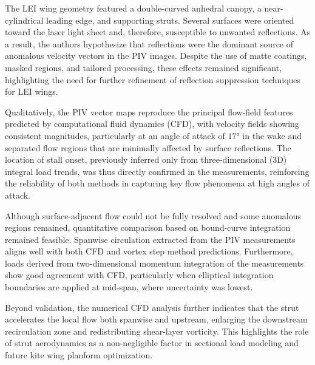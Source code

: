 \documentclass[wes, manuscript]{copernicus}
\begin{document}
The LEI wing geometry featured a double-curved anhedral canopy, a near-cylindrical leading edge, and supporting struts. Several surfaces were oriented toward the laser light sheet and, therefore, susceptible to unwanted reflections.
As a result, the authors hypothesize that reflections were the dominant source of anomalous velocity vectors in the PIV images. Despite the use of matte coatings, masked regions, and tailored processing, these effects remained significant, highlighting the need for further refinement of reflection suppression techniques for LEI wings.

Qualitatively, the PIV vector maps reproduce the principal flow-field features predicted by computational fluid dynamics (CFD), with velocity fields showing consistent magnitudes, particularly at an angle of attack of $17\unit{\degree}$ in the wake and separated flow regions that are minimally affected by surface reflections. The location of stall onset, previously inferred only from three-dimensional (3D) integral load trends, was thus directly confirmed in the measurements, reinforcing the reliability of both methods in capturing key flow phenomena at high angles of attack.

Although surface-adjacent flow could not be fully resolved and some anomalous regions remained, quantitative comparison based on bound-curve integration remained feasible. Spanwise circulation extracted from the PIV measurements aligns well with both CFD and vortex step method predictions. Furthermore, loads derived from two-dimensional momentum integration of the measurements show good agreement with CFD, particularly when elliptical integration boundaries are applied at mid-span, where uncertainty was lowest. 

Beyond validation, the numerical CFD analysis further indicates that the strut accelerates the local flow both spanwise and upstream, enlarging the downstream recirculation zone and redistributing shear-layer vorticity. This highlights the role of strut aerodynamics as a non-negligible factor in sectional load modeling and future kite wing planform optimization.
\end{document}
